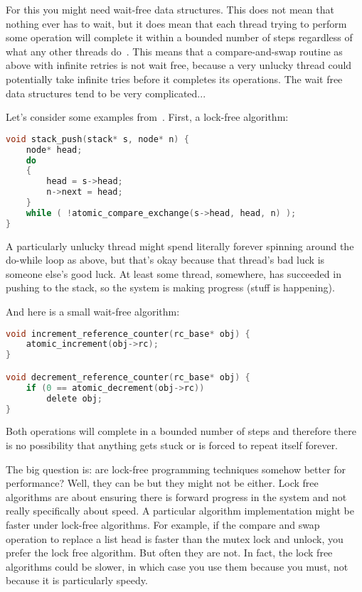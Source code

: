 For this you might need wait-free data structures. This does not mean that nothing ever has to wait, but it does mean that each thread trying to perform some operation will complete it within a bounded number of steps regardless of what any other threads do~\cite{nblfwf}. This means that a compare-and-swap routine as above with infinite retries is not wait free, because a very unlucky thread could potentially take infinite tries before it completes its operations. The wait free data structures tend to be very complicated...

Let's consider some examples from~\cite{1024cores}. First, a lock-free algorithm:

\begin{lstlisting}[language=C]
void stack_push(stack* s, node* n) {
    node* head;
    do
    {
        head = s->head;
        n->next = head;
    }
    while ( !atomic_compare_exchange(s->head, head, n) );
} 
\end{lstlisting}

A particularly unlucky thread might spend literally forever spinning around the do-while loop as above, but that's okay because that thread's bad luck is someone else's good luck. At least some thread, somewhere, has succeeded in pushing to the stack, so the system is making progress (stuff is happening). 

And here is a small wait-free algorithm:

\begin{lstlisting}[language=C]
void increment_reference_counter(rc_base* obj) {
    atomic_increment(obj->rc);
}

void decrement_reference_counter(rc_base* obj) {
    if (0 == atomic_decrement(obj->rc))
        delete obj;
} 
\end{lstlisting}

Both operations will complete in a bounded number of steps and therefore there is no possibility that anything gets stuck or is forced to repeat itself forever. 

The big question is: are lock-free programming techniques somehow better for performance? Well, they can be but they might not be either. Lock free algorithms are about ensuring there is forward progress in the system and not really specifically about speed. A particular algorithm implementation might be faster under lock-free algorithms. For example, if the compare and swap operation to replace a list head is faster than the mutex lock and unlock, you prefer the lock free algorithm. But often they are not. In fact, the lock free algorithms could be slower, in which case you use them because you must, not because it is particularly speedy.




